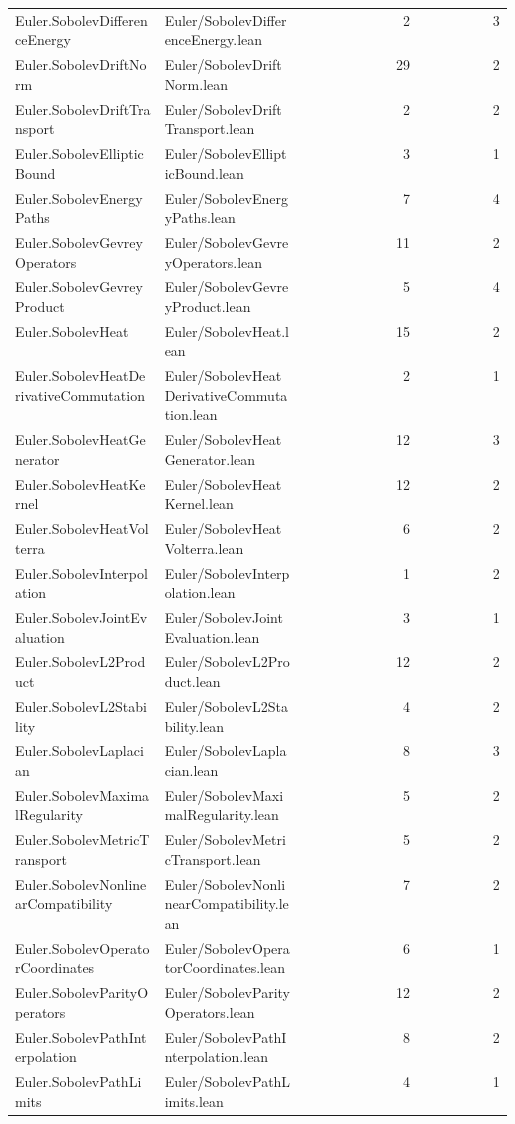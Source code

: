 \begin{longtable}{p{0.30\linewidth}p{0.28\linewidth}rr}
Euler.SobolevDifferenceEnergy & Euler/SobolevDifferenceEnergy.lean & 2 & 3\\
Euler.SobolevDriftNorm & Euler/SobolevDriftNorm.lean & 29 & 2\\
Euler.SobolevDriftTransport & Euler/SobolevDriftTransport.lean & 2 & 2\\
Euler.SobolevEllipticBound & Euler/SobolevEllipticBound.lean & 3 & 1\\
Euler.SobolevEnergyPaths & Euler/SobolevEnergyPaths.lean & 7 & 4\\
Euler.SobolevGevreyOperators & Euler/SobolevGevreyOperators.lean & 11 & 2\\
Euler.SobolevGevreyProduct & Euler/SobolevGevreyProduct.lean & 5 & 4\\
Euler.SobolevHeat & Euler/SobolevHeat.lean & 15 & 2\\
Euler.SobolevHeatDerivativeCommutation & Euler/SobolevHeatDerivativeCommutation.lean & 2 & 1\\
Euler.SobolevHeatGenerator & Euler/SobolevHeatGenerator.lean & 12 & 3\\
Euler.SobolevHeatKernel & Euler/SobolevHeatKernel.lean & 12 & 2\\
Euler.SobolevHeatVolterra & Euler/SobolevHeatVolterra.lean & 6 & 2\\
Euler.SobolevInterpolation & Euler/SobolevInterpolation.lean & 1 & 2\\
Euler.SobolevJointEvaluation & Euler/SobolevJointEvaluation.lean & 3 & 1\\
Euler.SobolevL2Product & Euler/SobolevL2Product.lean & 12 & 2\\
Euler.SobolevL2Stability & Euler/SobolevL2Stability.lean & 4 & 2\\
Euler.SobolevLaplacian & Euler/SobolevLaplacian.lean & 8 & 3\\
Euler.SobolevMaximalRegularity & Euler/SobolevMaximalRegularity.lean & 5 & 2\\
Euler.SobolevMetricTransport & Euler/SobolevMetricTransport.lean & 5 & 2\\
Euler.SobolevNonlinearCompatibility & Euler/SobolevNonlinearCompatibility.lean & 7 & 2\\
Euler.SobolevOperatorCoordinates & Euler/SobolevOperatorCoordinates.lean & 6 & 1\\
Euler.SobolevParityOperators & Euler/SobolevParityOperators.lean & 12 & 2\\
Euler.SobolevPathInterpolation & Euler/SobolevPathInterpolation.lean & 8 & 2\\
Euler.SobolevPathLimits & Euler/SobolevPathLimits.lean & 4 & 1\\

\end{longtable}

